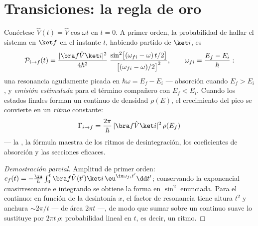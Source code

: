 \section{Transiciones: la regla de oro}

\begin{theorem}\label{thm:b3:perturbation-theory:golden}
Conéctese $\hat V(t) = \hat V\cos\omega t$ en $t = 0$. A primer
orden, la probabilidad de hallar el sistema en $\ket f$ en el instante
$t$, habiendo partido de $\ket i$, es
\[
\mathcal P_{i\to f}(t) = \frac{|\bra f\hat V\ket i|^2}{4\hbar^2}\;
\frac{\sin^2\!\big[(\omega_{fi} - \omega)\,t/2\big]}
{\big[(\omega_{fi} - \omega)/2\big]^2} ,
\qquad \omega_{fi} = \frac{E_f - E_i}{\hbar} :
\]
una resonancia agudamente picada en $\hbar\omega = E_f - E_i$ ---
absorción cuando $E_f > E_i$, y \emph{emisión estimulada} para el
término compañero con $E_f < E_i$. Cuando los estados finales forman un
continuo de densidad $\rho(E)$, el crecimiento del pico se convierte en un
\emph{ritmo} constante:
\[
\Gamma_{i\to f} = \frac{2\pi}{\hbar}\,
|\bra f\hat V\ket i|^2\,\rho(E_f)
\]
--- la \emph{}, la fórmula maestra de los ritmos de
desintegración, los coeficientes de absorción y las secciones eficaces.
\end{theorem}

\begin{proof}[Demostración parcial]
Amplitud de primer orden: $c_f(t) = -\tfrac{\iu}{\hbar}\int_0^t\bra
f\hat V(t')\ket i\,\eu^{\iu\omega_{fi}t'}\dd t'$; conservando la
exponencial cuasirresonante e integrando se obtiene la forma en
$\sin^2$ enunciada. Para el continuo: en función de la desintonía
$x$, el factor de resonancia tiene altura $t^2$ y anchura $\sim 2\pi/t$
--- de área $2\pi t$ ---, de modo que sumar sobre un continuo suave lo
sustituye por $2\pi t\,\rho$: probabilidad lineal en $t$, es decir, un ritmo.
\end{proof}

